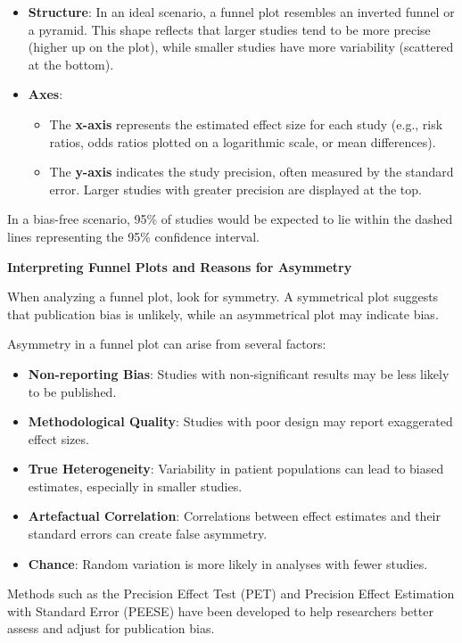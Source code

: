 \documentclass[
]{book}
\begin{document}
\begin{itemize}
\item
  \textbf{Structure}: In an ideal scenario, a funnel plot resembles an inverted funnel or a pyramid. This shape reflects that larger studies tend to be more precise (higher up on the plot), while smaller studies have more variability (scattered at the bottom).
\item
  \textbf{Axes}:

  \begin{itemize}
  \item
    The \textbf{x-axis} represents the estimated effect size for each study (e.g., risk ratios, odds ratios plotted on a logarithmic scale, or mean differences).
  \item
    The \textbf{y-axis} indicates the study precision, often measured by the standard error. Larger studies with greater precision are displayed at the top.
  \end{itemize}
\end{itemize}

In a bias-free scenario, 95\% of studies would be expected to lie within the dashed lines representing the 95\% confidence interval.

\textbf{Interpreting Funnel Plots and Reasons for Asymmetry}

When analyzing a funnel plot, look for symmetry. A symmetrical plot suggests that publication bias is unlikely, while an asymmetrical plot may indicate bias.

Asymmetry in a funnel plot can arise from several factors:

\begin{itemize}
\item
  \textbf{Non-reporting Bias}: Studies with non-significant results may be less likely to be published.
\item
  \textbf{Methodological Quality}: Studies with poor design may report exaggerated effect sizes.
\item
  \textbf{True Heterogeneity}: Variability in patient populations can lead to biased estimates, especially in smaller studies.
\item
  \textbf{Artefactual Correlation}: Correlations between effect estimates and their standard errors can create false asymmetry.
\item
  \textbf{Chance}: Random variation is more likely in analyses with fewer studies.
\end{itemize}

Methods such as the Precision Effect Test (PET) and Precision Effect Estimation with Standard Error (PEESE) have been developed to help researchers better assess and adjust for publication bias.
\end{document}
